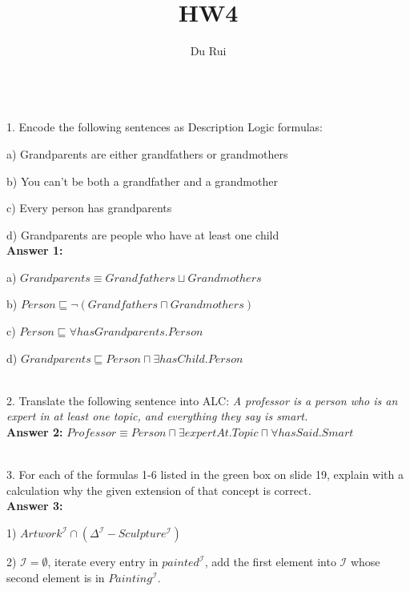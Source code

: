 \documentclass[11pt]{article}
\title{HW4}
\author{Du Rui}
\date{}
\begin{document}
\quad \\[0.1in] 
1. Encode the following sentences as Description Logic formulas:

a) Grandparents are either grandfathers or grandmothers

b) You can't be both a grandfather and a grandmother

c) Every person has grandparents

d) Grandparents are people who have at least one child \\[0.1in]

\textbf{Answer 1:}

a) $Grandparents \equiv Grandfathers \sqcup Grandmothers$

b) $Person \sqsubseteq \neg (Grandfathers \sqcap Grandmothers) $


c) $Person \sqsubseteq \forall hasGrandparents.Person$

d) $Grandparents \sqsubseteq Person \sqcap \exists hasChild.Person$





\quad \\[0.1in] 
2. Translate the following sentence into ALC: \emph{A professor is a person who is an expert in at least one topic, and everything they say is smart.} \\[0.1in]

\textbf{Answer 2:} $
Professor \equiv Person \sqcap \exists expertAt.Topic \sqcap \forall hasSaid.Smart
$



\quad \\[0.1in] 
3. For each of the formulas 1-6 listed in the green box on slide 19, explain with a calculation why the given extension of that concept is correct. \\[0.1in]

\textbf{Answer 3:}

1) $Artwork^\mathcal{I} \cap (\Delta^\mathcal{I} - Sculpture^\mathcal{I})$

2) $\mathcal{I} = \emptyset $, iterate every entry in $painted^{\mathcal{I}}$, add the first element into $\mathcal{I}$  whose second element is in $Painting^{\mathcal{I}}$. 
\end{document}
